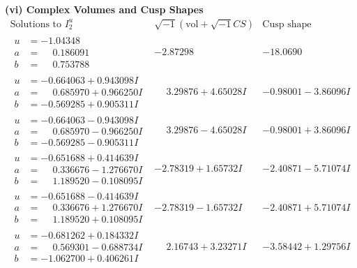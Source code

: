 \documentclass[1p]{elsarticle_modified}
\theoremstyle{definition}
\newcommand{\I}{\sqrt{-1}}
\begin{document}
\newpage\flushleft \textbf{(vi) Complex Volumes and Cusp Shapes}
$$\begin{array}{c|c|c}  
\text{Solutions to }I^u_{2}& \I (\text{vol} + \sqrt{-1}CS) & \text{Cusp shape}\\
 \hline 
\begin{aligned}
u &= -1.04348\phantom{ +0.000000I} \\
a &= \phantom{-}0.186091\phantom{ +0.000000I} \\
b &= \phantom{-}0.753788\phantom{ +0.000000I}\end{aligned}
 & -2.87298\phantom{ +0.000000I} & -18.0690\phantom{ +0.000000I} \\ \hline\begin{aligned}
u &= -0.664063 + 0.943098 I \\
a &= \phantom{-}0.685970 + 0.966250 I \\
b &= -0.569285 + 0.905311 I\end{aligned}
 & \phantom{-}3.29876 + 4.65028 I & -0.98001 - 3.86096 I \\ \hline\begin{aligned}
u &= -0.664063 - 0.943098 I \\
a &= \phantom{-}0.685970 - 0.966250 I \\
b &= -0.569285 - 0.905311 I\end{aligned}
 & \phantom{-}3.29876 - 4.65028 I & -0.98001 + 3.86096 I \\ \hline\begin{aligned}
u &= -0.651688 + 0.414639 I \\
a &= \phantom{-}0.336676 - 1.276670 I \\
b &= \phantom{-}1.189520 - 0.108095 I\end{aligned}
 & -2.78319 + 1.65732 I & -2.40871 - 5.71074 I \\ \hline\begin{aligned}
u &= -0.651688 - 0.414639 I \\
a &= \phantom{-}0.336676 + 1.276670 I \\
b &= \phantom{-}1.189520 + 0.108095 I\end{aligned}
 & -2.78319 - 1.65732 I & -2.40871 + 5.71074 I \\ \hline\begin{aligned}
u &= -0.681262 + 0.184332 I \\
a &= \phantom{-}0.569301 - 0.688734 I \\
b &= -1.062700 + 0.406261 I\end{aligned}
 & \phantom{-}2.16743 + 3.23271 I & -3.58442 + 1.29756 I \\ \hline\begin{aligned}

\end{aligned}
\end{array}$$
\end{document}
